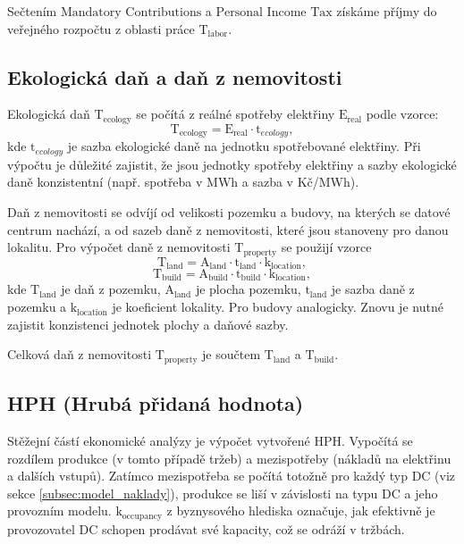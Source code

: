 Sečtením $\text{Mandatory Contributions}$ a $\text{Personal Income Tax}$ získáme příjmy do veřejného rozpočtu z oblasti práce $\text{T}_\text{labor}$.

\subsection{Ekologická daň a daň z nemovitosti}
\label{subsec:model_eko_dan_nemovitost}

Ekologická daň $\text{T}_\text{ecology}$ se počítá z reálné spotřeby elektřiny $\text{E}_\text{real}$ podle vzorce:
$$\text{T}_\text{ecology} = \text{E}_\text{real} \cdot \text{t}_{ecology},$$
kde $\text{t}_{ecology}$ je sazba ekologické daně na jednotku spotřebované elektřiny. Při výpočtu je důležité zajistit, že jsou jednotky spotřeby elektřiny a sazby ekologické daně konzistentní (např. spotřeba v MWh a sazba v Kč/MWh).

Daň z nemovitosti se odvíjí od velikosti pozemku a budovy, na kterých se datové centrum nachází, a od sazeb daně z nemovitosti, které jsou stanoveny pro danou lokalitu. Pro výpočet daně z nemovitosti $\text{T}_\text{property}$ se použijí vzorce
$$\text{T}_\text{land} = \text{A}_\text{land} \cdot \text{t}_\text{land} \cdot \text{k}_\text{location},$$
$$\text{T}_\text{build} = \text{A}_\text{build} \cdot \text{t}_\text{build} \cdot \text{k}_\text{location},$$
kde $\text{T}_\text{land}$ je daň z pozemku, $\text{A}_\text{land}$ je plocha pozemku, $\text{t}_\text{land}$ je sazba daně z pozemku a $\text{k}_\text{location}$ je koeficient lokality. Pro budovy analogicky. Znovu je nutné zajistit konzistenci jednotek plochy a daňové sazby.

Celková daň z nemovitosti $\text{T}_\text{property}$ je součtem $\text{T}_\text{land}$ a $\text{T}_\text{build}.$

\subsection{HPH (Hrubá přidaná hodnota)}
\label{subsec:model_hph}

Stěžejní částí ekonomické analýzy je výpočet vytvořené HPH. Vypočítá se rozdílem produkce (v tomto případě tržeb) a mezispotřeby (nákladů na elektřinu a dalších vstupů). Zatímco mezispotřeba se počítá totožně pro každý typ DC (viz sekce \ref{subsec:model_naklady}), produkce se liší v závislosti na typu DC a jeho provozním modelu. $\text{k}_\text{occupancy}$ z byznysového hlediska označuje, jak efektivně je provozovatel DC schopen prodávat své kapacity, což se odráží v tržbách.

